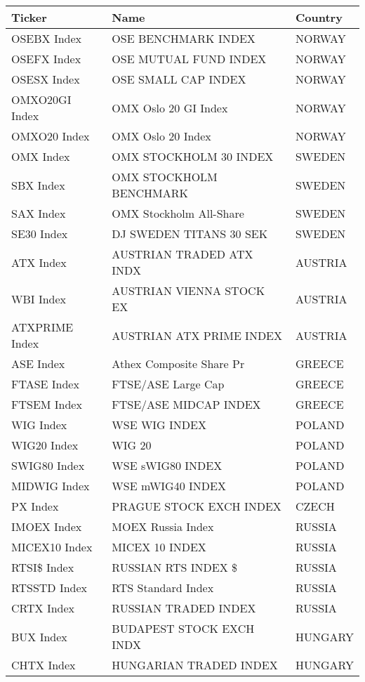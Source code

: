 \begin {table}[H]
\begin{center}
\small
\hspace*{-3cm}
\begin{tabu}{| l l l |} 
\hline
Ticker & Name & Country\\
\hline
OSEBX Index & OSE BENCHMARK INDEX & NORWAY \\ 
OSEFX Index & OSE MUTUAL FUND INDEX & NORWAY \\ 
OSESX Index & OSE SMALL CAP INDEX & NORWAY \\ 
OMXO20GI Index & OMX Oslo 20 GI Index & NORWAY \\ 
OMXO20 Index & OMX Oslo 20 Index & NORWAY \\ 
OMX Index & OMX STOCKHOLM 30 INDEX & SWEDEN \\ 
SBX Index & OMX STOCKHOLM BENCHMARK & SWEDEN \\ 
SAX Index & OMX Stockholm All-Share & SWEDEN \\ 
SE30 Index & DJ SWEDEN TITANS 30 SEK & SWEDEN \\ 
ATX Index & AUSTRIAN TRADED ATX INDX & AUSTRIA \\ 
WBI Index & AUSTRIAN VIENNA STOCK EX & AUSTRIA \\ 
ATXPRIME Index & AUSTRIAN ATX PRIME INDEX & AUSTRIA \\ 
ASE Index & Athex Composite Share Pr & GREECE \\ 
FTASE Index & FTSE/ASE Large Cap & GREECE \\ 
FTSEM Index & FTSE/ASE MIDCAP INDEX & GREECE \\ 
WIG Index & WSE WIG INDEX & POLAND \\ 
WIG20 Index & WIG 20 & POLAND \\ 
SWIG80 Index & WSE sWIG80 INDEX & POLAND \\ 
MIDWIG Index & WSE mWIG40 INDEX & POLAND \\ 
PX Index & PRAGUE STOCK EXCH INDEX & CZECH \\ 
IMOEX Index & MOEX Russia Index & RUSSIA \\ 
MICEX10 Index & MICEX 10 INDEX & RUSSIA \\ 
RTSI\$ Index & RUSSIAN RTS INDEX \$ & RUSSIA \\ 
RTSSTD Index & RTS Standard Index & RUSSIA \\ 
CRTX Index & RUSSIAN TRADED INDEX & RUSSIA \\ 
BUX Index & BUDAPEST STOCK EXCH INDX & HUNGARY \\ 
CHTX Index & HUNGARIAN TRADED INDEX & HUNGARY \\ 

\end{tabu}
\end{center}
\end{table}

